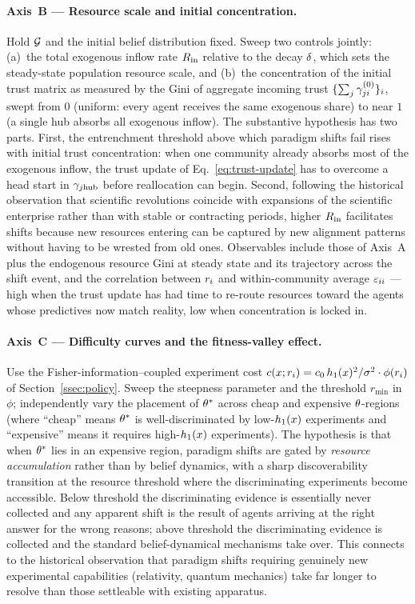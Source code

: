 \paragraph{Axis~B --- Resource scale and initial concentration.}
Hold $\mathcal{G}$ and the initial belief distribution fixed. Sweep two
controls jointly: (a)~the total exogenous inflow rate $R_{\mathrm{in}}$
relative to the decay $\delta$, which sets the steady-state
population resource scale, and (b)~the concentration of the initial
trust matrix as measured by the Gini of aggregate incoming trust
$\{\sum_j \gamma_{ji}^{(0)}\}_i$, swept from $0$ (uniform: every
agent receives the same exogenous share) to near $1$ (a single hub
absorbs all exogenous inflow). The substantive hypothesis has two
parts. First, the entrenchment threshold above which paradigm shifts
fail rises with initial trust concentration: when one community
already absorbs most of the exogenous inflow, the trust update of
Eq.~\eqref{eq:trust-update} has to overcome a head start in
$\gamma_{j\mathrm{hub}}$ before reallocation can begin. Second,
following the historical observation that scientific revolutions
coincide with expansions of the scientific enterprise rather than
with stable or contracting periods, higher $R_{\mathrm{in}}$ facilitates
shifts because new resources entering can be captured by new
alignment patterns without having to be wrested from old ones.
Observables include those of Axis~A plus the endogenous resource
Gini at steady state and its trajectory across the shift event, and
the correlation between $r_{i}$ and within-community average
$\varepsilon_{ii}$ --- high when the trust update has had time to
re-route resources toward the agents whose predictives now match
reality, low when concentration is locked in.

\paragraph{Axis~C --- Difficulty curves and the fitness-valley effect.}
Use the Fisher-information--coupled experiment cost
$c(x;r_{i}) = c_{0}\,h_{1}(x)^{2}/\sigma^{2} \cdot
\phi(r_{i})$ of Section~\ref{ssec:policy}. Sweep the steepness
parameter and the threshold $r_{\min}$ in $\phi$; independently vary the
placement of $\theta^{*}$ across cheap and expensive $\theta$-regions
(where ``cheap'' means $\theta^{*}$ is well-discriminated by
low-$h_{1}(x)$ experiments and ``expensive'' means it requires
high-$h_{1}(x)$ experiments). The hypothesis is that when
$\theta^{*}$ lies in an expensive region, paradigm shifts are gated by
\emph{resource accumulation} rather than by belief dynamics, with a
sharp discoverability transition at the resource threshold where the
discriminating experiments become accessible. Below threshold the
discriminating evidence is essentially never collected and any
apparent shift is the result of agents arriving at the right answer
for the wrong reasons; above threshold the discriminating evidence is
collected and the standard belief-dynamical mechanisms take over.
This connects to the historical observation that paradigm shifts
requiring genuinely new experimental capabilities (relativity, quantum
mechanics) take far longer to resolve than those settleable with
existing apparatus.


